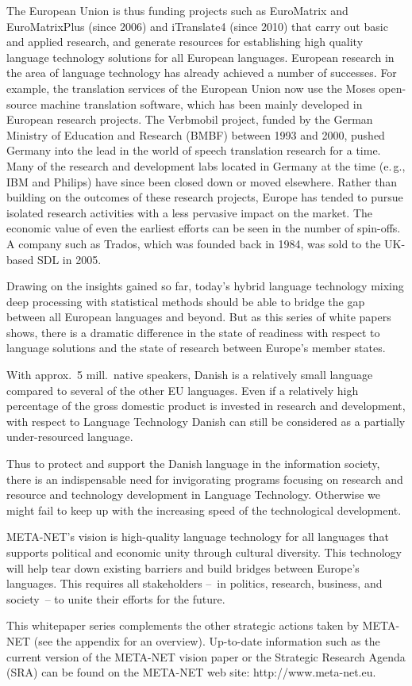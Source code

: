 \documentclass[]{../../metanetpaper}
\begin{document}
\begin{multicols}{2}
The European Union is thus funding projects such as EuroMatrix and EuroMatrixPlus (since 2006) and iTranslate4 (since 2010) that carry out basic and applied research, and generate resources for establishing high quality language technology solutions for all European languages. 
European research in the area of language technology has already achieved a number of successes. For example, the translation services of the European Union now use the Moses open-source machine translation software, which has been mainly developed in European research projects. The Verbmobil project, funded by the German Ministry of Education and Research (BMBF) between 1993 and 2000, pushed Germany into the lead in the world of speech translation research for a time. Many of the research and development labs located in Germany at the time (e.\,g., IBM and Philips) have since been closed down or moved elsewhere. Rather than building on the outcomes of these research projects, Europe has tended to pursue isolated research activities with a less pervasive impact on the market. The economic value of even the earliest efforts can be seen in the number of spin-offs. A company such as Trados, which was founded back in 1984, was sold to the UK-based SDL in 2005.


Drawing on the insights gained so far, today’s hybrid language technology mixing deep processing with statistical methods should be able to bridge the gap between all European languages and beyond. But as this series of white papers shows, there is a dramatic difference in the state of readiness with respect to language solutions and the state of research between Europe’s member states. 

With approx.\ 5 mill.\ native speakers, Danish is a relatively small language compared to several of the other EU languages. Even if a relatively high percentage of the gross domestic pro\-duct is invested in research and development, with respect to Language Technology Danish can still be considered as a partially under-resourced language.

Thus to protect and support the Danish language in the information society, there is an indispensable need for invigorating programs focusing on  research and resource and technology development in 
Language Technology. Otherwise we might fail to keep up with the increasing speed of the technological development.

META-NET’s vision is high-quality language technology for all languages that supports political and economic unity through cultural diversity. This technology will help tear down existing barriers and build bridges between Europe’s languages. This requires all stakeholders --~in politics, research, business, and society~-- to unite their efforts for the future.

This whitepaper series complements the other strategic actions taken by META-NET (see the appendix for an overview). Up-to-date information such as the current version of the META-NET vision paper \cite{Meta1} or the Strategic Research Agenda (SRA) can be found on the META-NET web site: http://www.meta-net.eu.
\end{multicols}
\end{document}
